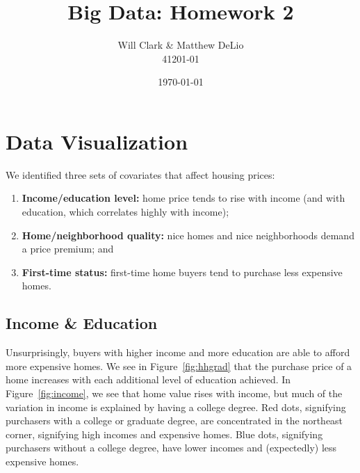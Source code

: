 \documentclass[11pt, fleqn]{article}
\begin{document}
\title{Big Data: Homework 2}
\author{Will Clark \& Matthew DeLio \\ 41201-01}
\date{\today}
\maketitle

\section{Data Visualization}

We identified three sets of covariates that affect housing prices:
\begin{enumerate}
\item \textbf{Income/education level:} home price tends to rise with income (and with education, which correlates highly with income);
\item \textbf{Home/neighborhood quality:} nice homes and nice neighborhoods demand a price premium; and
\item \textbf{First-time status:} first-time home buyers tend to purchase less expensive homes.
\end{enumerate}

\subsection{Income \& Education}

Unsurprisingly, buyers with higher income and more education are able to afford more expensive homes. We see in Figure~\vref{fig:hhgrad} that the purchase price of a home increases with each additional level of education achieved. In Figure~\vref{fig:income}, we see that home value rises with income, but much of the variation in income is explained by having a college degree. Red dots, signifying purchasers with a college or graduate degree, are concentrated in the northeast corner, signifying high incomes and expensive homes. Blue dots, signifying purchasers without a college degree, have lower incomes and (expectedly) less expensive homes.
\end{document}

